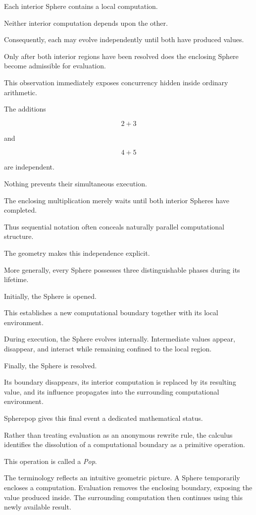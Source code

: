 \documentclass[12pt,oneside]{article}
\theoremstyle{definition}
\theoremstyle{remark}
\begin{document}
Each interior Sphere contains a local computation.

Neither interior computation depends upon the other.

Consequently, each may evolve independently until both have produced values.

Only after both interior regions have been resolved does the enclosing Sphere
become admissible for evaluation.

This observation immediately exposes concurrency hidden inside ordinary
arithmetic.

The additions

\[
2+3
\]

and

\[
4+5
\]

are independent.

Nothing prevents their simultaneous execution.

The enclosing multiplication merely waits until both interior Spheres have
completed.

Thus sequential notation often conceals naturally parallel computational
structure.

The geometry makes this independence explicit.

More generally, every Sphere possesses three distinguishable phases during its
lifetime.

Initially, the Sphere is opened.

This establishes a new computational boundary together with its local
environment.

During execution, the Sphere evolves internally.
Intermediate values appear, disappear, and interact while remaining confined
to the local region.

Finally, the Sphere is resolved.

Its boundary disappears, its interior computation is replaced by its resulting
value, and its influence propagates into the surrounding computational
environment.

Spherepop gives this final event a dedicated mathematical status.

Rather than treating evaluation as an anonymous rewrite rule, the calculus
identifies the dissolution of a computational boundary as a primitive
operation.

This operation is called a \emph{Pop}.

The terminology reflects an intuitive geometric picture.
A Sphere temporarily encloses a computation.
Evaluation removes the enclosing boundary, exposing the value produced inside.
The surrounding computation then continues using this newly available result.
\end{document}
